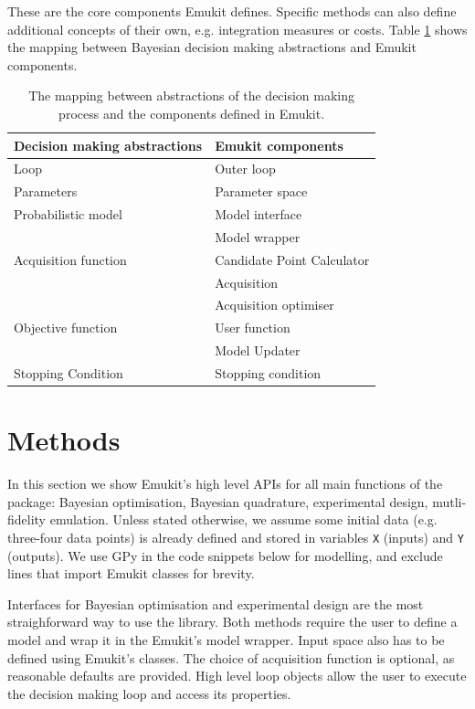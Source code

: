 These are the core components Emukit defines. Specific methods can also define additional concepts of their own, e.g. integration measures or costs. Table \ref{table:abstraction_mapping} shows the mapping between Bayesian decision making abstractions and Emukit components.

\begin{table}
    \setlength{\DUtablewidth}{\tablewidth}
    \begin{longtable}[c]{p{0.4\DUtablewidth}p{0.4\DUtablewidth}}
        \toprule
        \textbf{Decision making abstractions} & \textbf{Emukit components} \\
        \midrule
        \endfirsthead
        Loop & Outer loop \\
        \midrule
        Parameters & Parameter space \\
        Probabilistic model & Model interface \\
        & Model wrapper \\
        \midrule
        Acquisition function & Candidate Point Calculator \\
        & Acquisition \\
        & Acquisition optimiser \\
        \midrule
        Objective function & User function \\
        & Model Updater \\
        \midrule
        Stopping Condition & Stopping condition \\
        \bottomrule
    \end{longtable}
    \caption{The mapping between abstractions of the decision making process and the components defined in Emukit.}
    \label{table:abstraction_mapping}
\end{table}

\section{Methods}
In this section we show Emukit's high level APIs for all main functions of the package: Bayesian optimisation, Bayesian quadrature, experimental design, mutli-fidelity emulation. Unless stated otherwise, we assume some initial data (e.g. three-four data points) is already defined and stored in variables \texttt{X} (inputs) and \texttt{Y} (outputs). We use GPy \cite{gpy2014} in the code snippets below for modelling, and exclude lines that import Emukit classes for brevity.

Interfaces for Bayesian optimisation and experimental design are the most straighforward way to use the library. Both methods require the user to define a model and wrap it in the Emukit's model wrapper. Input space also has to be defined using Emukit's classes. The choice of acquisition function is optional, as reasonable defaults are provided. High level loop objects allow the user to execute the decision making loop and access its properties.

